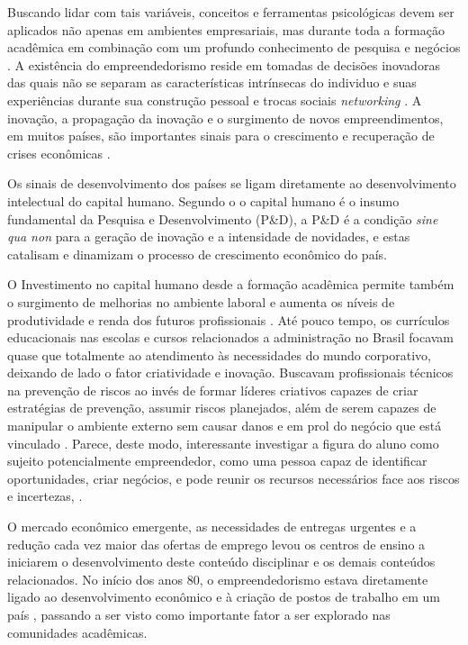 Buscando lidar com tais variáveis, conceitos e ferramentas psicológicas devem ser aplicados não apenas em ambientes empresariais, mas durante toda a formação acadêmica em combinação com um profundo conhecimento de pesquisa e negócios \cite{zhao_relationship_2010}. A existência do empreendedorismo reside em tomadas de decisões inovadoras das quais não se separam as características intrínsecas do individuo e suas experiências durante sua construção pessoal e trocas sociais \textit{networking} \cite{alencar_intencao_2019}. A inovação, a propagação da inovação e o surgimento de novos empreendimentos, em muitos países, são importantes sinais para o crescimento e recuperação de crises econômicas \cite{silva_mudancestrutural_2017}. 

Os sinais de desenvolvimento dos países se ligam diretamente ao desenvolvimento intelectual do capital humano. Segundo o  o capital humano é o insumo fundamental da Pesquisa e Desenvolvimento (P\&D), a P\&D é a condição \textit{sine qua non} para a geração de inovação e a intensidade de novidades, e estas catalisam e dinamizam o processo de crescimento econômico do país.


O Investimento no capital humano desde a formação acadêmica permite também o surgimento de melhorias no ambiente laboral e aumenta os níveis de produtividade e renda dos futuros profissionais \cite{macedo_capital_2019}. Até pouco tempo, os currículos educacionais nas escolas e cursos relacionados a administração no Brasil focavam quase que totalmente ao atendimento às necessidades do mundo corporativo, deixando de lado o fator criatividade e inovação. Buscavam profissionais técnicos na prevenção de riscos ao invés de formar líderes criativos capazes de criar estratégias de prevenção, assumir riscos planejados, além de serem capazes de manipular o ambiente externo sem causar danos e em prol do negócio que está vinculado \cite{palmer_chip_2019}. Parece, deste modo, interessante investigar a figura do aluno como sujeito potencialmente empreendedor, como uma pessoa capaz de identificar oportunidades, criar negócios, e pode reunir os recursos necessários face aos riscos e incertezas, \cite{pietrovski_alise_2019}.

O mercado econômico emergente, as necessidades de entregas urgentes e a redução cada vez maior das ofertas de emprego levou os centros de ensino a iniciarem o desenvolvimento deste conteúdo disciplinar e os demais conteúdos relacionados. No início dos anos 80, o empreendedorismo estava diretamente ligado ao desenvolvimento econômico e à criação de postos de trabalho em um país \cite{rodrigues_intencao_2019}, passando a ser visto como importante fator a ser explorado nas comunidades acadêmicas. 


